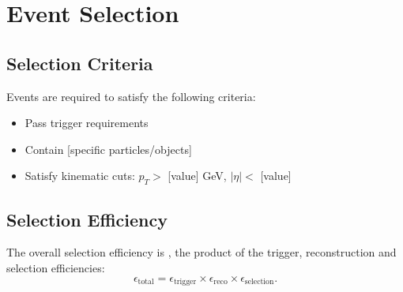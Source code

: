 \section{Event Selection}
\label{sec:RESULTS_EVENT_SELECTION}

\subsection{Selection Criteria}
\label{sec:RESULTS_EVENT_SELECTION_SELECTION_CRITERIA}

Events are required to satisfy the following criteria:
\begin{itemize}
  \item Pass trigger requirements
  \item Contain [specific particles/objects]
  \item Satisfy kinematic cuts: $p_T > $ [value] GeV, $|\eta| < $ [value]
\end{itemize}

\subsection{Selection Efficiency}
\label{sec:RESULTS_EVENT_SELECTION_SELECTION_EFFICIENCY}

The overall selection efficiency is \resExampleSignalEfficiency, the product of the trigger, reconstruction and selection efficiencies:
\begin{equation}
  \epsilon_{\mathrm{total}} = \epsilon_{\mathrm{trigger}} \times \epsilon_{\mathrm{reco}} \times \epsilon_{\mathrm{selection}}.
  \label{eq:efficiency}
\end{equation}

